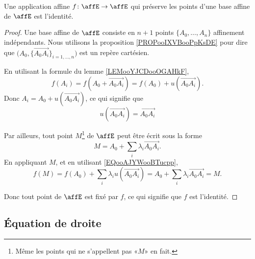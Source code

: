 \begin{lemma}       \label{LEMooDUMVooFtfFOe}
    Une application affine \( f\colon \affE\to \affE\) qui préserve les points d'une base affine de $\affE$ est l'identité.
\end{lemma}

\begin{proof}
    Une base affine de \( \affE\) consiste en \( n+1\) points \( \{ A_0,\ldots, A_n \}\) affinement indépendants. Nous utilisons la proposition \ref{PROPooIXVBooPpKsDE} pour dire que \( \big( A_0, \{ \overrightarrow{A_0A_i} \}_{i=1,\ldots, n} \big)\) est un repère cartésien.
    
    En utilisant la formule du lemme \ref{LEMooYJCDooOGAHkF},
    \begin{equation}
        f(A_i)=f(A_0+\overrightarrow{A_0A_i})=f(A_0)+u(\overrightarrow{A_0A_i}).
    \end{equation}
    Donc $A_i=A_0+u(\overrightarrow{A_0A_i})$, ce qui signifie que
    \begin{equation}        \label{EQooAJYWooBTucpp}
        u(\overrightarrow{A_0A_i})=\overrightarrow{A_0A_i}
    \end{equation}
    
    Par ailleurs, tout point \( M\)\footnote{Même les points qui ne s'appellent pas «\( M \)» en fait.} de \( \affE\) peut être écrit sous la forme
    \begin{equation}
        M=A_0+\sum_i\lambda_i\overrightarrow{A_0A_i}.
    \end{equation}
    En appliquant \( M\), et en utilisant \eqref{EQooAJYWooBTucpp},
    \begin{equation}
        f(M)=f(A_0)+\sum_i\lambda_iu(\overrightarrow{A_0A_i})=A_0+\sum_i\lambda_i\overrightarrow{A_0A_i}=M.
    \end{equation}
    
    Donc tout point de \( \affE\) est fixé par \( f\), ce qui signifie que \( f\) est l'identité.
\end{proof}

\subsection{Équation de droite}

